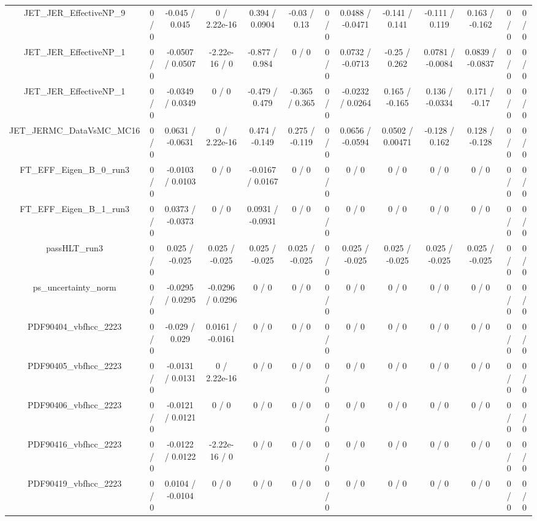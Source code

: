 \documentclass[10pt]{article}
\begin{document}
\begin{table}[htbp]
\begin{center}
\begin{tabular}{|c|c|c|c|c|c|c|c|c|c|c|c|c|}
  JET_JER_EffectiveNP_9 & 0 / 0 & -0.045 / 0.045 & 0 / 2.22e-16 & 0.394 / 0.0904 & -0.03 / 0.13 & 0 / 0 & 0.0488 / -0.0471 & -0.141 / 0.141 & -0.111 / 0.119 & 0.163 / -0.162 & 0 / 0 & 0 / 0 \\ 
  JET_JER_EffectiveNP_1 & 0 / 0 & -0.0507 / 0.0507 & -2.22e-16 / 0 & -0.877 / 0.984 & 0 / 0 & 0 / 0 & 0.0732 / -0.0713 & -0.25 / 0.262 & 0.0781 / -0.0084 & 0.0839 / -0.0837 & 0 / 0 & 0 / 0 \\ 
  JET_JER_EffectiveNP_1 & 0 / 0 & -0.0349 / 0.0349 & 0 / 0 & -0.479 / 0.479 & -0.365 / 0.365 & 0 / 0 & -0.0232 / 0.0264 & 0.165 / -0.165 & 0.136 / -0.0334 & 0.171 / -0.17 & 0 / 0 & 0 / 0 \\ 
  JET_JERMC_DataVsMC_MC16 & 0 / 0 & 0.0631 / -0.0631 & 0 / 2.22e-16 & 0.474 / -0.149 & 0.275 / -0.119 & 0 / 0 & 0.0656 / -0.0594 & 0.0502 / 0.00471 & -0.128 / 0.162 & 0.128 / -0.128 & 0 / 0 & 0 / 0 \\ 
  FT_EFF_Eigen_B_0_run3 & 0 / 0 & -0.0103 / 0.0103 & 0 / 0 & -0.0167 / 0.0167 & 0 / 0 & 0 / 0 & 0 / 0 & 0 / 0 & 0 / 0 & 0 / 0 & 0 / 0 & 0 / 0 \\ 
  FT_EFF_Eigen_B_1_run3 & 0 / 0 & 0.0373 / -0.0373 & 0 / 0 & 0.0931 / -0.0931 & 0 / 0 & 0 / 0 & 0 / 0 & 0 / 0 & 0 / 0 & 0 / 0 & 0 / 0 & 0 / 0 \\ 
  passHLT_run3 & 0 / 0 & 0.025 / -0.025 & 0.025 / -0.025 & 0.025 / -0.025 & 0.025 / -0.025 & 0 / 0 & 0.025 / -0.025 & 0.025 / -0.025 & 0.025 / -0.025 & 0.025 / -0.025 & 0 / 0 & 0 / 0 \\ 
  ps_uncertainty_norm & 0 / 0 & -0.0295 / 0.0295 & -0.0296 / 0.0296 & 0 / 0 & 0 / 0 & 0 / 0 & 0 / 0 & 0 / 0 & 0 / 0 & 0 / 0 & 0 / 0 & 0 / 0 \\ 
  PDF90404_vbfhcc_2223 & 0 / 0 & -0.029 / 0.029 & 0.0161 / -0.0161 & 0 / 0 & 0 / 0 & 0 / 0 & 0 / 0 & 0 / 0 & 0 / 0 & 0 / 0 & 0 / 0 & 0 / 0 \\ 
  PDF90405_vbfhcc_2223 & 0 / 0 & -0.0131 / 0.0131 & 0 / 2.22e-16 & 0 / 0 & 0 / 0 & 0 / 0 & 0 / 0 & 0 / 0 & 0 / 0 & 0 / 0 & 0 / 0 & 0 / 0 \\ 
  PDF90406_vbfhcc_2223 & 0 / 0 & -0.0121 / 0.0121 & 0 / 0 & 0 / 0 & 0 / 0 & 0 / 0 & 0 / 0 & 0 / 0 & 0 / 0 & 0 / 0 & 0 / 0 & 0 / 0 \\ 
  PDF90416_vbfhcc_2223 & 0 / 0 & -0.0122 / 0.0122 & -2.22e-16 / 0 & 0 / 0 & 0 / 0 & 0 / 0 & 0 / 0 & 0 / 0 & 0 / 0 & 0 / 0 & 0 / 0 & 0 / 0 \\ 
  PDF90419_vbfhcc_2223 & 0 / 0 & 0.0104 / -0.0104 & 0 / 0 & 0 / 0 & 0 / 0 & 0 / 0 & 0 / 0 & 0 / 0 & 0 / 0 & 0 / 0 & 0 / 0 & 0 / 0 \\ 

\end{tabular}
\end{center}
\end{table}
\end{document}
